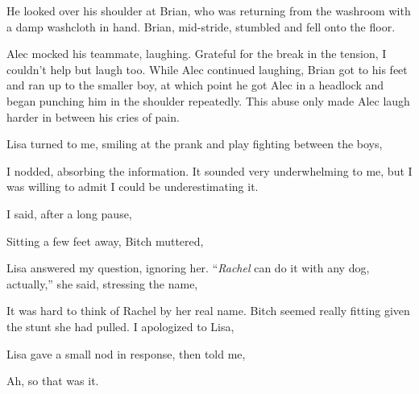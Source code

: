  He looked over his shoulder at Brian, who was returning from the washroom with a damp washcloth in hand. Brian, mid-stride, stumbled and fell onto the floor.

 Alec mocked his teammate, laughing. Grateful for the break in the tension, I couldn't help but laugh too. While Alec continued laughing, Brian got to his feet and ran up to the smaller boy, at which point he got Alec in a headlock and began punching him in the shoulder repeatedly. This abuse only made Alec laugh harder in between his cries of pain.

Lisa turned to me, smiling at the prank and play fighting between the boys, 

I nodded, absorbing the information. It sounded very underwhelming to me, but I was willing to admit I could be underestimating it.

 I said, after a long pause, 

Sitting a few feet away, Bitch muttered, 

Lisa answered my question, ignoring her. “{\em Rachel} can do it with any dog, actually,” she said, stressing the name, 

It was hard to think of Rachel by her real name. Bitch seemed really fitting given the stunt she had pulled. I apologized to Lisa, 

Lisa gave a small nod in response, then told me, 

Ah, so that was it. 

